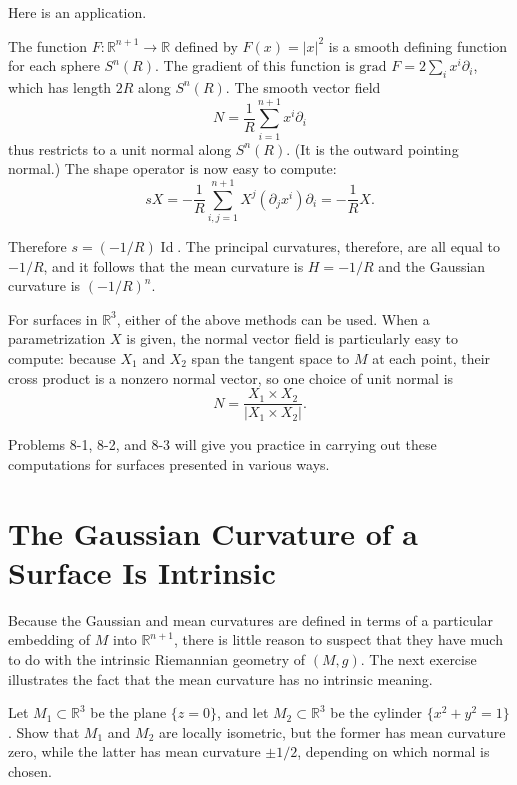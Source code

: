 Here is an application.

\begin{example}
\label{ex:shape-operators-spheres}
The function $F: \mathbb{R}^{n+1} \to \mathbb{R}$ defined by $F(x) = |x|^2$ is a smooth defining function for each sphere $S^n(R)$. The gradient of this function is $\text{grad } F = 2 \sum_i x^i \partial_i$, which has length $2R$ along $S^n(R)$. The smooth vector field
\[
N = \frac{1}{R} \sum_{i=1}^{n+1} x^i \partial_i
\]
thus restricts to a unit normal along $S^n(R)$. (It is the outward pointing normal.) The shape operator is now easy to compute:
\[
s X = -\frac{1}{R} \sum_{i,j=1}^{n+1} X^j (\partial_j x^i) \partial_i = -\frac{1}{R} X.
\]
\end{example}

Therefore $s = (-1/R)\operatorname{Id}$. The principal curvatures, therefore, are all equal to $-1/R$, and it follows that the mean curvature is $H = -1/R$ and the Gaussian curvature is $(-1/R)^n$.

For surfaces in $\mathbb{R}^3$, either of the above methods can be used. When a parametrization $X$ is given, the normal vector field is particularly easy to compute: because $X_1$ and $X_2$ span the tangent space to $M$ at each point, their cross product is a nonzero normal vector, so one choice of unit normal is
\begin{equation}
N = \frac{X_1 \times X_2}{|X_1 \times X_2|}.
\tag{8.26}
\end{equation}

Problems 8-1, 8-2, and 8-3 will give you practice in carrying out these computations for surfaces presented in various ways.

\section{The Gaussian Curvature of a Surface Is Intrinsic}

Because the Gaussian and mean curvatures are defined in terms of a particular embedding of $M$ into $\mathbb{R}^{n+1}$, there is little reason to suspect that they have much to do with the intrinsic Riemannian geometry of $(M,g)$. The next exercise illustrates the fact that the mean curvature has no intrinsic meaning.

\begin{exercise}
\label{exer:plane-cylinder-isometric}
Let $M_1 \subset \mathbb{R}^3$ be the plane $\{z = 0\}$, and let $M_2 \subset \mathbb{R}^3$ be the cylinder $\{x^2 + y^2 = 1\}$. Show that $M_1$ and $M_2$ are locally isometric, but the former has mean curvature zero, while the latter has mean curvature $\pm 1/2$, depending on which normal is chosen.
\end{exercise}

